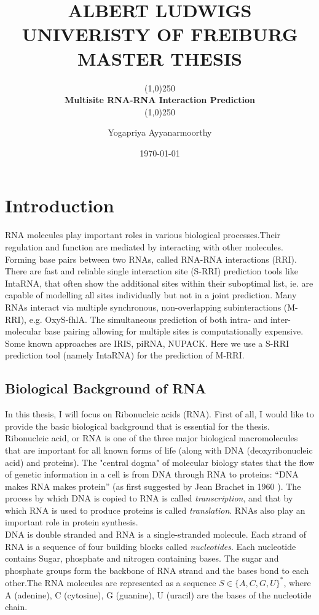 \documentclass[twoside,a4paper]{report}
\title{ALBERT LUDWIGS UNIVERISTY OF FREIBURG
\\{\Large MASTER THESIS}}
\subtitle{\line(1,0){250}\\\textbf{\Huge Multisite RNA-RNA Interaction Prediction}\\\line(1,0){250}}
\author{Yogapriya Ayyanarmoorthy}
\date{\today}
\begin{document}
	
	\maketitle
	
	\tableofcontents
	
	\chapter{Introduction}
	RNA molecules play important roles in various biological processes.Their regulation and function are mediated by interacting with other molecules. 	Forming base pairs between two RNAs, called RNA-RNA interactions (RRI). There are fast and reliable single interaction site (S-RRI) prediction tools like IntaRNA, that often show the additional sites within their suboptimal list, ie. are capable of modelling all sites individually but not in a joint prediction. Many RNAs interact via multiple synchronous, non-overlapping subinteractions (M-RRI), e.g. OxyS-fhlA. The simultaneous prediction of both intra- and inter-molecular base pairing allowing for multiple sites is computationally expensive. Some known approaches are IRIS, piRNA, NUPACK. Here we use a S-RRI prediction tool (namely IntaRNA) for the prediction of M-RRI.
	
	\section{Biological Background of RNA}
	In this thesis, I will focus on Ribonucleic acids (RNA). First of all, I would like to provide the basic biological background that is essential for the thesis. Ribonucleic acid, or RNA is one of the three major biological macromolecules that are important for all known forms of life (along with DNA (deoxyribonucleic acid) and proteins). The "central dogma" of molecular biology states that the flow of genetic information in a cell is from DNA through RNA to proteins: “DNA makes RNA makes protein” (as first suggested by Jean Brachet in 1960 )\citep{brachet1956remarks}. The process by which DNA is copied to RNA is called \textit{transcription}, and that by which RNA is used to produce proteins is called \textit{translation}. RNAs also play an important role in protein synthesis. \\
	
	 DNA is double stranded and RNA is a single-stranded molecule. Each strand of RNA is a sequence of four building blocks called \textit{nucleotides}. Each nucleotide contains Sugar, phosphate and nitrogen containing bases. The sugar and phosphate groups form the backbone of RNA strand and the bases bond to each other.The RNA molecules are represented as a sequence $S \in \{A, C, G, U\} ^*$, where A (adenine), C (cytosine), G (guanine), U (uracil) are the bases of the nucleotide chain.\\
	 
\end{document}
